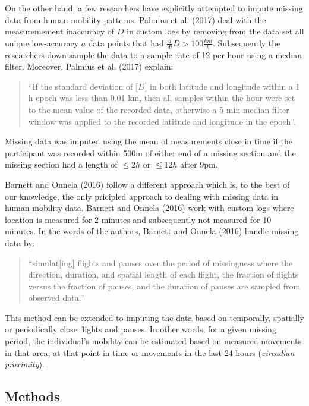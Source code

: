 \documentclass[english,man]{apa6}
\newcounter{author}
\theoremstyle{definition}
\theoremstyle{definition}
\theoremstyle{definition}
\theoremstyle{remark}
\begin{document}
On the other hand, a few researchers have explicitly attempted to impute
missing data from human mobility patterns. Palmius et al. (2017) deal
with the measuremement inaccuracy of \(D\) in custom logs by removing
from the data set all unique low-accuracy \(a\) data points that had
\(\frac{d}{dt}D > 100 \frac{km}{h}\). Subsequently the researchers down
sample the data to a sample rate of 12 per hour using a median filter.
Moreover, Palmius et al. (2017) explain:

\begin{quote}
\enquote{If the standard deviation of {[}\(D\){]} in both latitude and
longitude within a 1 h epoch was less than 0.01 km, then all samples
within the hour were set to the mean value of the recorded data,
otherwise a 5 min median filter window was applied to the recorded
latitude and longitude in the epoch}.
\end{quote}

Missing data was imputed using the mean of measurements close in time if
the participant was recorded within 500m of either end of a missing
section and the missing section had a length of \(\leq 2h\) or
\(\leq 12h\) after 9pm.

Barnett and Onnela (2016) follow a different approach which is, to the
best of our knowledge, the only pricipled approach to dealing with
missing data in human mobility data. Barnett and Onnela (2016) work with
custom logs where location is measured for 2 minutes and subsequently
not measured for 10 minutes. In the words of the authors, Barnett and
Onnela (2016) handle missing data by:

\begin{quote}
\enquote{simulat{[}ing{]} flights and pauses over the period of
missingness where the direction, duration, and spatial length of each
flight, the fraction of flights versus the fraction of pauses, and the
duration of pauses are sampled from observed data.}
\end{quote}

This method can be extended to imputing the data based on temporally,
spatially or periodically close flights and pauses. In other words, for
a given missing period, the individual's mobility can be estimated based
on measured movements in that area, at that point in time or movements
in the last 24 hours (\emph{circadian proximity}).

\subsection{Methods}\label{methods}
\end{document}
